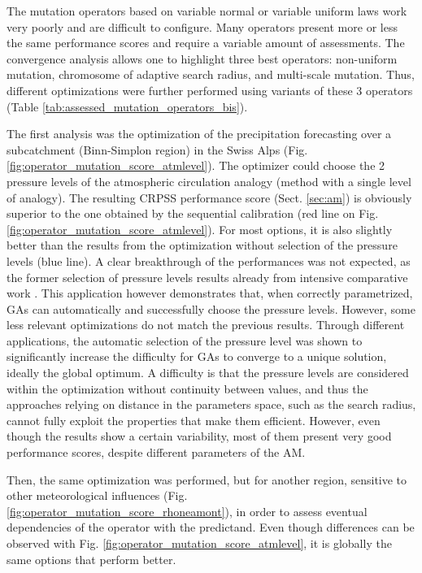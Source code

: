 \documentclass{ametsoc}
\begin{document}
The mutation operators based on variable normal or variable uniform laws work very poorly and are difficult to configure. Many operators present more or less the same performance scores and require a variable amount of assessments. The convergence analysis \citep[see][]{Horton2012a} allows one to highlight three best operators: non-uniform mutation, chromosome of adaptive search radius, and multi-scale mutation. Thus, different optimizations were further performed using variants of these 3 operators (Table \ref{tab:assessed_mutation_operators_bis}).

The first analysis was the optimization of the precipitation forecasting over a subcatchment (Binn-Simplon region) in the Swiss Alps (Fig. \ref{fig:operator_mutation_score_atmlevel}). The optimizer could choose the 2 pressure levels of the atmospheric circulation analogy (method with a single level of analogy). The resulting CRPSS performance score (Sect. \ref{sec:am}) is obviously superior to the one obtained by the sequential calibration (red line on Fig. \ref{fig:operator_mutation_score_atmlevel}). For most options, it is also slightly better than the results from the optimization without selection of the pressure levels (blue line). A clear breakthrough of the performances was not expected, as the former selection of pressure levels results already from intensive comparative work \citep{Bontron2004}. This application however demonstrates that, when correctly parametrized, GAs can automatically and successfully choose the pressure levels. However, some less relevant optimizations do not match the previous results. Through different applications, the automatic selection of the pressure level was shown to significantly increase the difficulty for GAs to converge to a unique solution, ideally the global optimum. A difficulty is that the pressure levels are considered within the optimization without continuity between values, and thus the approaches relying on distance in the parameters space, such as the search radius, cannot fully exploit the properties that make them efficient. However, even though the results show a certain variability, most of them present very good performance scores, despite different parameters of the AM.

Then, the same optimization was performed, but for another region, sensitive to other meteorological influences (Fig. \ref{fig:operator_mutation_score_rhoneamont}), in order to assess eventual dependencies of the operator with the predictand. Even though differences can be observed with Fig. \ref{fig:operator_mutation_score_atmlevel}, it is globally the same options that perform better.
\end{document}
